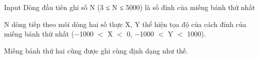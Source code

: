 Input
Dòng đầu tiên ghi số N (3 ≤ N ≤ 5000) là số đỉnh của miếng bánh thứ nhất  

   N dòng tiếp theo mõi dòng hai số thực X, Y thể hiện tọa độ của cách đỉnh của miếng bánh thứ nhất (−1000 $<$ X $<$ 0, −1000 $<$ Y $<$ 1000).  

   Miếng bánh thứ hai cũng được ghi cùng định dạng như thế.